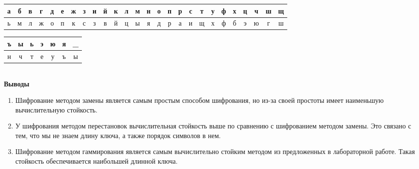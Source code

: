 \documentclass[a4paper,14pt]{extarticle}
\begin{document}
    \begin{center}
        \begin{tabular}{|c|c|c|c|c|c|c|c|c|c|c|c|c|c|c|c|c|c|c|c|c|c|c|c|c|c|}
            \hline
            а & б & в & г & д & е & ж & з & и & й & к & л & м & н & о & п & р & с & т & у & ф & х & ц & ч & ш & щ  \\
            \hline
            ь & м & л & ж & о & п & к & с & з & в & й & ц & ы & я & д & р & а & и & щ & х & ф & б & э & ю & г & ш   \\
            \hline
        \end{tabular}

    \end{center}
    \begin{tabular}{|c|c|c|c|c|c|c|}
        \hline
        ъ & ы & ь & э & ю & я & \_ \\
        \hline
        н & ч & т & е & у & ъ & ы \\
        \hline
    \end{tabular}\\



    \textbf{Выводы}
    \begin{enumerate}
        \item Шифрование методом замены является самым простым способом шифрования,
        но из-за своей простоты имеет наименьшую вычислительную стойкость.
        \item У шифрования методом перестановок вычислительная стойкость выше по сравнению
        с шифрованием методом замены. Это связано с тем, что мы не знаем длину ключа, а также
        порядок символов в нем.
        \item Шифрование методом гаммирования является самым вычислительно стойким методом из
        предложенных в лабораторной работе. Такая стойкость обеспечивается наибольшей длинной ключа.
    \end{enumerate}
\end{document}
